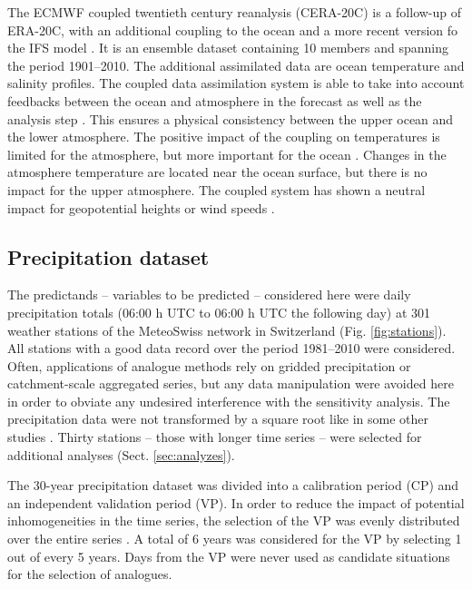 \documentclass{ametsoc}
\begin{document}
The ECMWF coupled twentieth century reanalysis (CERA-20C) is a follow-up of ERA-20C, with an additional coupling to the ocean and a more recent version fo the IFS model \citep{Laloyaux2017}. It is an ensemble dataset containing 10 members and spanning the period 1901--2010. The additional assimilated data are ocean temperature and salinity profiles. The coupled data assimilation system is able to take into account feedbacks between the ocean and atmosphere in the forecast as well as the analysis step \citep{Laloyaux2016}. This ensures a physical consistency between the upper ocean and the lower atmosphere. The positive impact of the coupling on temperatures is limited for the atmosphere, but more important for the ocean \citep{Laloyaux2016}. Changes in the atmosphere temperature are located near the ocean surface, but there is no impact for the upper atmosphere. The coupled system has shown a neutral impact for geopotential heights or wind speeds \citep{Laloyaux2016}.



\subsection{Precipitation dataset}
\label{sec:precip}

The predictands -- variables to be predicted -- considered here were daily precipitation totals (06:00 h UTC to 06:00 h UTC the following day) at 301 weather stations of the MeteoSwiss network in Switzerland (Fig. \ref{fig:stations}). All stations with a good data record over the period 1981--2010 were considered. Often, applications of analogue methods rely on gridded precipitation or catchment-scale aggregated series, but any data manipulation were avoided here in order to obviate any undesired interference with the sensitivity analysis. The precipitation data were not transformed by a square root like in some other studies \cite[see e.g.][]{Bontron2004}. Thirty stations -- those with longer time series -- were selected for additional analyses (Sect. \ref{sec:analyzes}).

The 30-year precipitation dataset was divided into a calibration period (CP) and an independent validation period (VP). In order to reduce the impact of potential inhomogeneities in the time series, the selection of the VP was evenly distributed over the entire series \citep[as in][]{BenDaoud2010}. A total of 6 years was considered for the VP by selecting 1 out of every 5 years. Days from the VP were never used as candidate situations for the selection of analogues.
\end{document}
